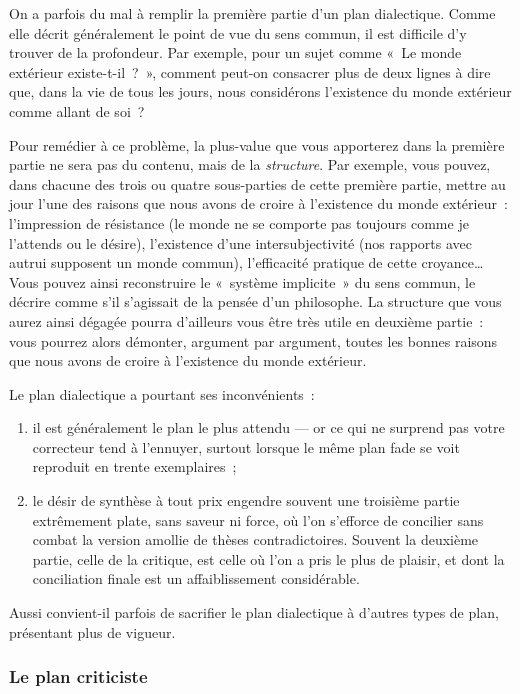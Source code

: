 \documentclass[a4paper]{article}
\begin{document}
On a parfois du mal à remplir la première partie d'un plan dialectique.
Comme elle décrit généralement le point de vue du sens commun, il est
difficile d'y trouver de la profondeur. Par exemple, pour un sujet comme
« Le monde extérieur existe-t-il ? », comment peut-on consacrer plus de
deux lignes à dire que, dans la vie de tous les jours, nous considérons
l'existence du monde extérieur comme allant de soi ?

Pour remédier à ce problème, la plus-value que vous apporterez dans la
première partie ne sera pas du contenu, mais de la \emph{structure}. Par
exemple, vous pouvez, dans chacune des trois ou quatre sous-parties de
cette première partie, mettre au jour l'une des raisons que nous avons
de croire à l'existence du monde extérieur : l'impression de résistance
(le monde ne se comporte pas toujours comme je l'attends ou le désire),
l'existence d'une intersubjectivité (nos rapports avec autrui supposent
un monde commun), l'efficacité pratique de cette croyance\ldots{} Vous pouvez
ainsi reconstruire le « système implicite » du sens commun, le décrire
comme s'il s'agissait de la pensée d'un philosophe. La structure que
vous aurez ainsi dégagée pourra d'ailleurs vous être très utile en
deuxième partie : vous pourrez alors démonter, argument par argument,
toutes les bonnes raisons que nous avons de croire à l'existence du
monde extérieur.

Le plan dialectique a pourtant ses inconvénients :

\begin{enumerate}
\item il est généralement le plan le plus attendu --- or ce qui ne surprend
   pas votre correcteur tend à l'ennuyer, surtout lorsque le même plan
   fade se voit reproduit en trente exemplaires ;
\item le désir de synthèse à tout prix engendre souvent une troisième
   partie extrêmement plate, sans saveur ni force, où l'on s'efforce de
   concilier sans combat la version amollie de thèses contradictoires.
   Souvent la deuxième partie, celle de la critique, est celle où l'on a
   pris le plus de plaisir, et dont la conciliation finale est un
   affaiblissement considérable.
\end{enumerate}

Aussi convient-il parfois de sacrifier le plan dialectique à d'autres
types de plan, présentant plus de vigueur.
\subsubsection{Le plan criticiste}
\label{sec-3-2-2}
\end{document}
